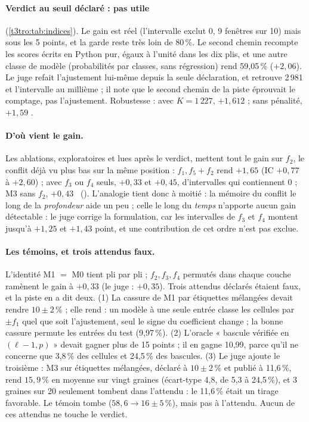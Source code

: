 \paragraph{Verdict au seuil déclaré : pas utile} (\cref{t3tro:tab:indices}). Le gain est réel (l'intervalle exclut 0, 9 fenêtres sur 10) mais sous les 5 points, et la garde reste très loin de 80\,\%. Le second chemin recompte les scores écrits en Python pur, égaux à l'unité dans les dix plis, et une autre classe de modèle (probabilités par classes, sans régression) rend 59,05\,\% ($+2{,}06$). Le juge refait l'ajustement lui-même depuis la seule déclaration, et retrouve 2\,981 et l'intervalle au millième ; il note que le second chemin de la piste éprouvait le comptage, pas l'ajustement. Robustesse : avec $K = 1\,227$, $+1{,}612$ ; sans pénalité, $+1{,}59$ \mes.

\paragraph{D'où vient le gain.} Les ablations, exploratoires et lues après le verdict, mettent tout le gain sur $f_2$, le conflit déjà vu plus bas sur la même position : $f_1, f_5 + f_2$ rend $+1{,}65$ (IC $+0{,}77$ à $+2{,}60$) ; avec $f_3$ ou $f_4$ seuls, $+0{,}33$ et $+0{,}45$, d'intervalles qui contiennent 0 ; M3 sans $f_2$, $+0{,}43$ \mes~(). L'analogie tient donc à moitié : la mémoire du conflit le long de la \emph{profondeur} aide un peu ; celle le long du \emph{temps} n'apporte  aucun gain détectable : le juge corrige la formulation, car les intervalles de $f_3$ et $f_4$ montent jusqu'à $+1{,}25$ et $+1{,}43$ point, et une contribution de cet ordre n'est pas exclue.

\paragraph{Les témoins, et trois attendus faux.} L'identité M1 $=$ M0 tient pli par pli ; $f_2, f_3, f_4$ permutés dans chaque couche ramènent le gain à $+0{,}33$ (le juge : $+0{,}35$). Trois attendus déclarés étaient faux, et la piste en a dit deux. (1) La cassure de M1 par étiquettes mélangées devait rendre $10 \pm 2\,\%$ ; elle rend  : un modèle à une seule entrée classe les cellules par $\pm f_1$ quel que soit l'ajustement, seul le signe du coefficient change ; la bonne cassure permute les entrées du test (9,97\,\%). (2) L'oracle « bascule vérifiée en $(\ell - 1, p)$ » devait gagner plus de 15 points ; il en gagne 10,99, parce qu'il ne concerne que 3,8\,\% des cellules et 24,5\,\% des bascules. (3) Le juge ajoute le troisième : M3 sur étiquettes mélangées, déclaré à $10 \pm 2\,\%$ et publié à 11,6\,\%, rend $15{,}9\,\%$ en moyenne sur vingt graines (écart-type 4,8, de 5,3 à 24,5\,\%), et 3 graines sur 20 seulement tombent dans l'attendu : le 11,6\,\% était un tirage favorable. Le témoin tombe ($58{,}6 \to 16 \pm 5\,\%$), mais pas à l'attendu. Aucun de ces attendus ne touche le verdict.

